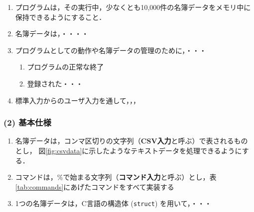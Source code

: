 \begin{enumerate}
  \setlength{\parskip}{0em} \setlength{\itemsep}{0.25em}  %
    \item プログラムは，その実行中，少なくとも10,000件の名簿データをメモリ中に保持できるようにすること．
    \item 名簿データは，・・・・
    \item プログラムとしての動作や名簿データの管理のために，・・・
    \begin{enumerate} \setlength{\parskip}{0em} \setlength{\itemsep}{0.25em}
        \item プログラムの正常な終了
        \item 登録された・・・
    \end{enumerate}
    \item 標準入力からのユーザ入力を通して，，，      %
\end{enumerate}

\subsubsection*{(2) 基本仕様}

\begin{enumerate}
  \setlength{\parskip}{0em} \setlength{\itemsep}{0.25em}  %
    \item 名簿データは，コンマ区切りの文字列（\textbf{CSV入力}と呼ぶ）で表されるものとし，%
          図\ref{fig:csvdata}に示したようなテキストデータを処理できるようにする．%
    \item コマンドは，\%で始まる文字列（\textbf{コマンド入力}と呼ぶ）とし，表\ref{tab:commands}にあげたコマンドをすべて実装する
    \item 1つの名簿データは，C言語の構造体 (\texttt{struct}) を用いて，・・・   %
\end{enumerate}

